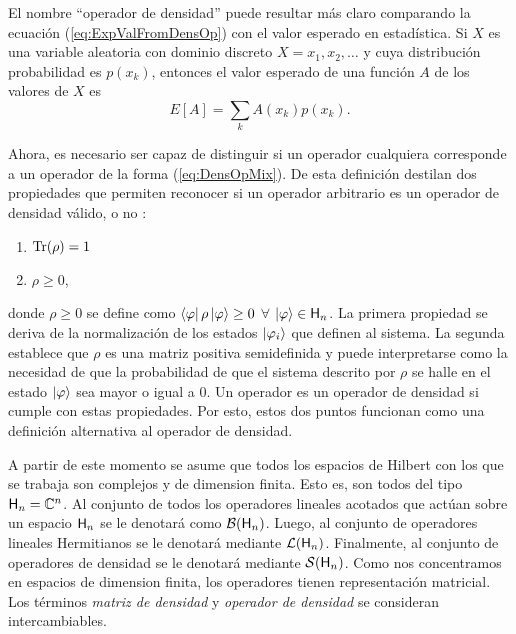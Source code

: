 El nombre ``operador de densidad'' puede resultar más claro comparando la ecuación (\ref{eq:ExpValFromDensOp}) con el valor esperado en estadística. Si $X$ es una variable aleatoria con dominio discreto $X=x_1,x_2,\dots$ y cuya distribución probabilidad es $p(x_k)$, entonces el valor esperado de una función $A$ de los valores de $X$ es
\begin{equation}
E[A]=\sum_{k} A(x_k) p(x_k).\nonumber
\end{equation}

Ahora, es necesario ser capaz de distinguir si un operador cualquiera corresponde a un operador de la forma (\ref{eq:DensOpMix}). De esta definición destilan dos propiedades que permiten reconocer si un operador arbitrario es un operador de densidad válido, o no \cite{Holevo}:
\begin{enumerate}
    \item $\Tr(\rho)=1$
    \item $\rho\geq 0$,
\end{enumerate}
donde $\rho\geq 0$ se define como $\bra{\varphi}\rho\ket{\varphi}\geq 0$ $\forall$ $\ket{\varphi}\in{\sf H}_{n}$.
La primera propiedad se deriva de la normalización de los estados $\ket{\varphi_{i}}$ que definen al sistema. La segunda establece que $\rho$ es una matriz positiva semidefinida y puede interpretarse como la necesidad de que la probabilidad de que el sistema descrito por $\rho$ se halle en el estado $\ket{\varphi}$ sea mayor o igual a $0$. Un operador es un operador de densidad si cumple con estas propiedades. Por esto, estos dos puntos funcionan como una definición alternativa al operador de densidad.


A partir de este momento se asume que todos los espacios de Hilbert con los que se trabaja son complejos y de dimension finita. Esto es, son todos del tipo ${\sf H}_{n}=\mathbb{C}^{n}$. Al conjunto de todos los operadores lineales acotados que actúan sobre un espacio ${\sf H}_{n}$ se le denotará como $\mathcal{B}({\sf H}_{n})$. Luego, al conjunto de operadores lineales Hermitianos se le denotará mediante $\mathcal{L}({\sf H}_{n})$. Finalmente, al conjunto de operadores de densidad se le denotará mediante $\mathcal{S}({\sf H}_{n})$. Como nos concentramos en espacios de dimension finita, los operadores tienen representación matricial. Los términos \textit{matriz de densidad} y \textit{operador de densidad} se consideran intercambiables.



